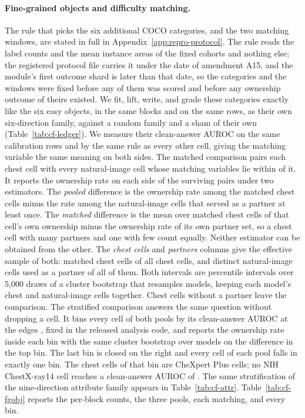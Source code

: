 \documentclass{article}
\begin{document}
\paragraph{Fine-grained objects and difficulty matching.} The rule that picks the six additional COCO categories, and the two matching windows, are stated in full in Appendix~\ref{app:repro-protocol}. The rule reads the label counts and the mean instance areas of the fixed cohorts and nothing else; the registered protocol file carries it under the date of amendment A15, and the module's first outcome shard is later than that date, so the categories and the windows were fixed before any of them was scored and before any ownership outcome of theirs existed. We fit, lift, write, and grade these categories exactly like the six easy objects, in the same blocks and on the same rows, as their own six-direction family, against a random family and a sham of their own (Table~\ref{tab:cf-ledger}). We measure their clean-answer AUROC on the same calibration rows and by the same rule as every other cell, giving the matching variable the same meaning on both sides. The matched comparison pairs each chest cell with every natural-image cell whose matching variables lie within \cfFgWindow{} of it. It reports the ownership rate on each side of the surviving pairs under two estimators. The \emph{pooled} difference is the ownership rate among the matched chest cells minus the rate among the natural-image cells that served as a partner at least once. The \emph{matched} difference is the mean over matched chest cells of that cell's own ownership minus the ownership rate of its own partner set, so a chest cell with many partners and one with few count equally. Neither estimator can be obtained from the other. The \emph{chest cells} and \emph{partners} columns give the effective sample of both: matched chest cells of all chest cells, and distinct natural-image cells used as a partner of all of them. Both intervals are percentile intervals over 5{,}000 draws of a cluster bootstrap that resamples models, keeping each model's chest and natural-image cells together. Chest cells without a partner leave the comparison. The stratified comparison answers the same question without dropping a cell. It bins every cell of both pools by its clean-answer AUROC at the edges \cfStratEdges{}, fixed in the released analysis code, and reports the ownership rate inside each bin with the same cluster bootstrap over models on the difference in the top bin. The last bin is closed on the right and every cell of each pool falls in exactly one bin. The \cfStratChestTopN{} chest cells of that bin are CheXpert Plus cells; no NIH ChestX-ray14 cell reaches a clean-answer AUROC of \cfStratTopEdge{}. The same stratification of the nine-direction attribute family appears in Table~\ref{tab:cf-attr}. Table~\ref{tab:cf-fgobj} reports the per-block counts, the three pools, each matching, and every bin.
\end{document}
